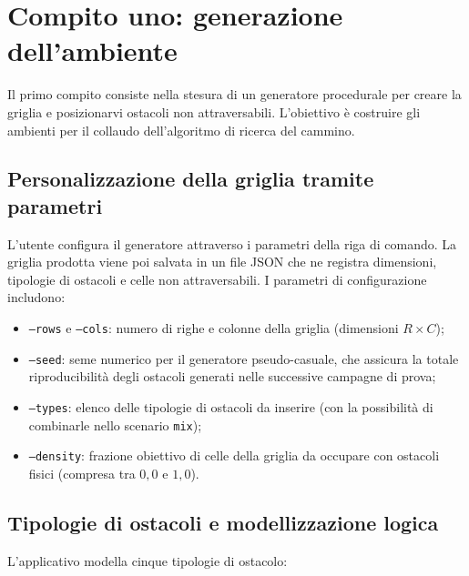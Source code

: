 \section{Compito uno: generazione dell'ambiente}

Il primo compito consiste nella stesura di un generatore procedurale per creare la griglia e posizionarvi ostacoli non attraversabili. L'obiettivo è costruire gli ambienti per il collaudo dell'algoritmo di ricerca del cammino.

\subsection{Personalizzazione della griglia tramite parametri}

L'utente configura il generatore attraverso i parametri della riga di comando. La griglia prodotta viene poi salvata in un file JSON che ne registra dimensioni, tipologie di ostacoli e celle non attraversabili. I parametri di configurazione includono:
\begin{itemize}
    \item \texttt{---rows} e \texttt{---cols}: numero di righe e colonne della griglia (dimensioni $R \times C$);
    \item \texttt{---seed}: seme numerico per il generatore pseudo-casuale, che assicura la totale riproducibilità degli ostacoli generati nelle successive campagne di prova;
    \item \texttt{---types}: elenco delle tipologie di ostacoli da inserire (con la possibilità di combinarle nello scenario \texttt{mix});
    \item \texttt{---density}: frazione obiettivo di celle della griglia da occupare con ostacoli fisici (compresa tra $0{,}0$ e $1{,}0$).
\end{itemize}

\subsection{Tipologie di ostacoli e modellizzazione logica}

L'applicativo modella cinque tipologie di ostacolo:


